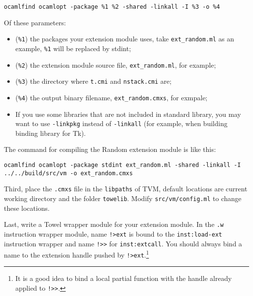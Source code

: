 \documentclass{article}
\newcommand{\inst}[1] {\texttt{inst:#1}}
\begin{document}
\texttt{ocamlfind ocamlopt -package \%1 \%2 -shared -linkall -I \%3 -o \%4}
\newline

Of these parameters:
\begin{itemize}
\item (\texttt{\%1}) the packages your extension module uses, take \texttt{ext\_random.ml} as an example, \texttt{\%1} will be replaced by stdint;
\item (\texttt{\%2}) the extension module source file, \texttt{ext\_random.ml}, for example;
\item (\texttt{\%3}) the directory where \texttt{t.cmi} and \texttt{nstack.cmi} are;
\item (\texttt{\%4}) the output binary filename, \texttt{ext\_random.cmxs}, for exmpale;
\item If you use some libraries that are not included in standard library, you may want to use \texttt{-linkpkg} instead of \texttt{-linkall} (for example, when building binding library for Tk).
\end{itemize}

The command for compiling the Random extension module is like this:\newline

\texttt{ocamlfind ocamlopt -package stdint ext\_random.ml -shared -linkall -I ../../build/src/vm -o ext\_random.cmxs}
\newline

Third, place the \texttt{.cmxs} file in the \texttt{libpaths} of TVM, default locations are current working directory and the folder \texttt{towelib}. Modify \texttt{src/vm/config.ml} to change these locations.

Last, write a Towel wrapper module for your extension module. In the \texttt{.w} instruction wrapper module, name \texttt{!>ext} is bound to the \inst{load-ext} instruction wrapper and name \texttt{!>>} for \inst{extcall}. You should always bind a name to the extension handle pushed by \texttt{!>ext}.\footnote{It is a good idea to bind a local partial function with the handle already applied to \texttt{!>>}.}
\end{document}
